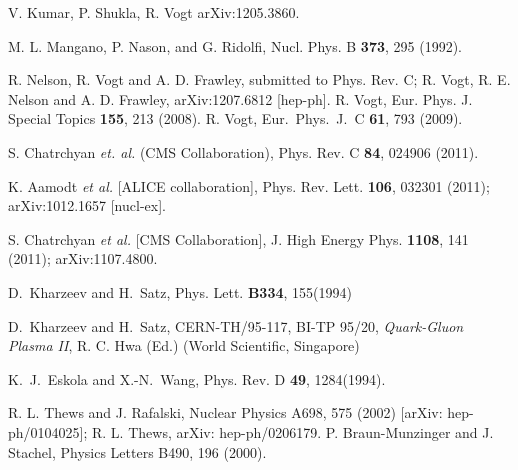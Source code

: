 \documentclass[aps,prc,preprint,superscriptaddress,showpacs,showkeys]{revtex4-1}
\begin{document}
\begin{thebibliography}{100}
 V. Kumar, P. Shukla, R. Vogt arXiv:1205.3860.

 M. L. Mangano, P. Nason, and G. Ridolfi, Nucl. Phys. B 
{\bf 373}, 295 (1992).


 R. Nelson, R. Vogt and A. D. Frawley, submitted to Phys. Rev. C;
R. Vogt, R. E. Nelson and A. D. Frawley, arXiv:1207.6812 [hep-ph].
 R. Vogt, Eur. Phys. J.
Special Topics {\bf 155}, 213 (2008).
 R. Vogt, Eur.\ Phys.\ J.\ C {\bf 61}, 793 (2009).


 S. Chatrchyan {\it et. al.} (CMS Collaboration), 
Phys. Rev. C {\bf 84}, 024906 (2011).

 K. Aamodt {\it et al.} [ALICE collaboration], Phys. Rev. Lett. {\bf 106}, 032301 (2011);
          arXiv:1012.1657 [nucl-ex].

 S. Chatrchyan {\it et al.} [CMS Collaboration], J. High Energy Phys. {\bf 1108}, 141 (2011);
       arXiv:1107.4800.  

D.~Kharzeev and H.~Satz, Phys. Lett. {\bf B334}, 155(1994)

D.~Kharzeev and H.~Satz, CERN-TH/95-117, BI-TP 95/20,
         {\it Quark-Gluon Plasma II}, R. C. Hwa (Ed.) (World Scientific, Singapore)

K.~J.~Eskola and X.-N.~Wang, Phys. Rev. D {\bf 49}, 1284(1994).


 R. L. Thews and J. Rafalski, Nuclear Physics A698, 575 (2002) [arXiv: hep-ph/0104025];
               R. L. Thews, arXiv: hep-ph/0206179.
 P. Braun-Munzinger and J. Stachel, Physics Letters B490, 196 (2000).




















\end{thebibliography}
\end{document}
